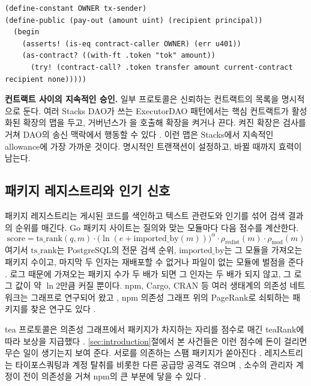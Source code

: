 \begin{lstlisting}[language=Clarity,caption={Clarity~4의 자산 한도. 볼트 소유자만 지급을 시작할 수 있고, 본문이 실행되는 동안 볼트에서 나갈 수 있는 토큰은 최대 \code{amount}이다.},label={lst:as-contract},float=htbp]
(define-constant OWNER tx-sender)
(define-public (pay-out (amount uint) (recipient principal))
  (begin
    (asserts! (is-eq contract-caller OWNER) (err u401))
    (as-contract? ((with-ft .token "tok" amount))
      (try! (contract-call? .token transfer amount current-contract recipient none)))))
\end{lstlisting}

\textbf{컨트랙트 사이의 지속적인 승인.} 일부 프로토콜은 신뢰하는 컨트랙트의 목록을 명시적으로 둔다. 여러 Stacks DAO가 쓰는 ExecutorDAO 패턴에서는 핵심 컨트랙트가 활성화된 확장의 맵을 두고, 거버넌스가 을 호출해 확장을 켜거나 끈다. 켜진 확장은  검사를 거쳐 DAO의 송신 맥락에서 행동할 수 있다 \cite{executordao}. 이런 맵은 Stacks에서 지속적인 allowance에 가장 가까운 것이다. 명시적인 트랜잭션이 설정하고, 바뀔 때까지 효력이 남는다.

\subsection{패키지 레지스트리와 인기 신호}
\label{sec:bg-registries}

패키지 레지스트리는 게시된 코드를 색인하고 텍스트 관련도와 인기를 섞어 검색 결과의 순위를 매긴다. Go 패키지 사이트는 질의와 맞는 모듈마다 다음 점수를 계산한다.
\begin{equation}
\label{eq:pkgsite}
\mathrm{score} = \mathrm{ts\_rank}(q,m)\cdot\bigl(\ln(e + \mathrm{imported\_by}(m))\bigr)^{\alpha}\cdot\rho_{\mathrm{redist}}(m)\cdot\rho_{\mathrm{mod}}(m)
\end{equation}
여기서 $\mathrm{ts\_rank}$는 PostgreSQL의 전문 검색 순위, $\mathrm{imported\_by}$는 그 모듈을 가져오는 패키지 수이고, 마지막 두 인자는 재배포할 수 없거나  파일이 없는 모듈에 벌점을 준다 \cite{pkgsite}. 로그 때문에 가져오는 패키지 수가 두 배가 되면 그 인자는 두 배가 되지 않고, 그 로그 값이 약 $\ln 2$만큼 커질 뿐이다. npm, Cargo, CRAN 등 여러 생태계의 의존성 네트워크는 그래프로 연구되어 왔고 \cite{kikas2017structure,decan2019empirical}, npm 의존성 그래프 위의 PageRank로 쇠퇴하는 패키지를 찾은 연구도 있다 \cite{mujahid2021centrality}.

tea 프로토콜은 의존성 그래프에서 패키지가 차지하는 자리를 점수로 매긴 teaRank에 따라 보상을 지급했다 \cite{tea2022}. \ref{sec:introduction}절에서 본 사건들은 이런 점수에 돈이 걸리면 무슨 일이 생기는지 보여 준다. 서로를 의존하는 스팸 패키지가 쏟아진다 \cite{sonatype2024tea,aws2025tea}. 레지스트리는 타이포스쿼팅과 계정 탈취를 비롯한 다른 공급망 공격도 겪으며 \cite{ohm2020backstabber,ladisa2023sok,vu2020typosquatting}, 소수의 관리자 계정이 전이 의존성을 거쳐 npm의 큰 부분에 닿을 수 있다 \cite{zimmermann2019small}.

